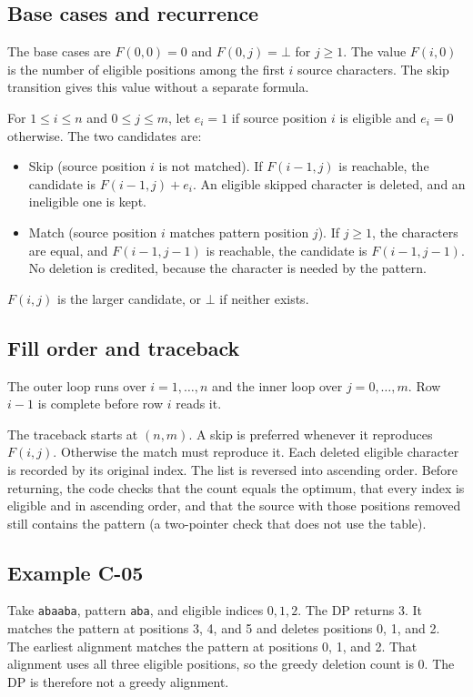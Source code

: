 \documentclass[11pt]{article}
\begin{document}
\subsection{Base cases and recurrence}

The base cases are $F(0,0) = 0$ and $F(0,j) = \bot$ for $j \ge 1$. The value $F(i,0)$ is the number
of eligible positions among the first $i$ source characters. The skip transition gives this value
without a separate formula.

For $1 \le i \le n$ and $0 \le j \le m$, let $e_i = 1$ if source position $i$ is eligible and
$e_i = 0$ otherwise. The two candidates are:
\begin{itemize}
\item Skip (source position $i$ is not matched). If $F(i-1,j)$ is reachable, the candidate is
  $F(i-1,j) + e_i$. An eligible skipped character is deleted, and an ineligible one is kept.
\item Match (source position $i$ matches pattern position $j$). If $j \ge 1$, the characters are
  equal, and $F(i-1,j-1)$ is reachable, the candidate is $F(i-1,j-1)$. No deletion is credited,
  because the character is needed by the pattern.
\end{itemize}
$F(i,j)$ is the larger candidate, or $\bot$ if neither exists.

\subsection{Fill order and traceback}

The outer loop runs over $i = 1, \ldots, n$ and the inner loop over $j = 0, \ldots, m$. Row $i-1$ is
complete before row $i$ reads it.

The traceback starts at $(n, m)$. A skip is preferred whenever it reproduces $F(i,j)$. Otherwise the
match must reproduce it. Each deleted eligible character is recorded by its original index. The list
is reversed into ascending order. Before returning, the code checks that the count equals the
optimum, that every index is eligible and in ascending order, and that the source with those
positions removed still contains the pattern (a two-pointer check that does not use the table).

\subsection{Example C-05}

Take \texttt{abaaba}, pattern \texttt{aba}, and eligible indices $0, 1, 2$. The DP returns 3. It
matches the pattern at positions 3, 4, and 5 and deletes positions 0, 1, and 2. The earliest
alignment matches the pattern at positions 0, 1, and 2. That alignment uses all three eligible
positions, so the greedy deletion count is 0. The DP is therefore not a greedy alignment.
\end{document}
